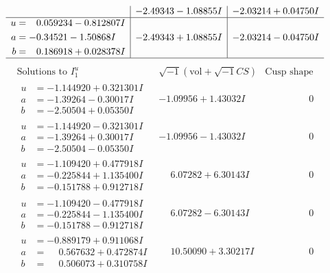\documentclass[1p]{elsarticle_modified}
\theoremstyle{definition}
\newcommand{\I}{\sqrt{-1}}
\begin{document}
$$\begin{array}{c|c|c}
 & -2.49343 - 1.08855 I & -2.03214 + 0.04750 I \\ \hline\begin{aligned}
u &= \phantom{-}0.059234 - 0.812807 I \\
a &= -0.34521 - 1.50868 I \\
b &= \phantom{-}0.186918 + 0.028378 I\end{aligned}
 & -2.49343 + 1.08855 I & -2.03214 - 0.04750 I\\
 \hline 
 \end{array}$$\newpage$$\begin{array}{c|c|c}  
\text{Solutions to }I^u_{1}& \I (\text{vol} + \sqrt{-1}CS) & \text{Cusp shape}\\
 \hline 
\begin{aligned}
u &= -1.144920 + 0.321301 I \\
a &= -1.39264 - 0.30017 I \\
b &= -2.50504 + 0.05350 I\end{aligned}
 & -1.09956 + 1.43032 I & \phantom{-0.000000 } 0 \\ \hline\begin{aligned}
u &= -1.144920 - 0.321301 I \\
a &= -1.39264 + 0.30017 I \\
b &= -2.50504 - 0.05350 I\end{aligned}
 & -1.09956 - 1.43032 I & \phantom{-0.000000 } 0 \\ \hline\begin{aligned}
u &= -1.109420 + 0.477918 I \\
a &= -0.225844 + 1.135400 I \\
b &= -0.151788 + 0.912718 I\end{aligned}
 & \phantom{-}6.07282 + 6.30143 I & \phantom{-0.000000 } 0 \\ \hline\begin{aligned}
u &= -1.109420 - 0.477918 I \\
a &= -0.225844 - 1.135400 I \\
b &= -0.151788 - 0.912718 I\end{aligned}
 & \phantom{-}6.07282 - 6.30143 I & \phantom{-0.000000 } 0 \\ \hline\begin{aligned}
u &= -0.889179 + 0.911068 I \\
a &= \phantom{-}0.567632 + 0.472874 I \\
b &= \phantom{-}0.506073 + 0.310758 I\end{aligned}
 & \phantom{-}10.50090 + 3.30217 I & \phantom{-0.000000 } 0 \\ \hline\begin{aligned}

\end{aligned}
\end{array}$$
\end{document}
